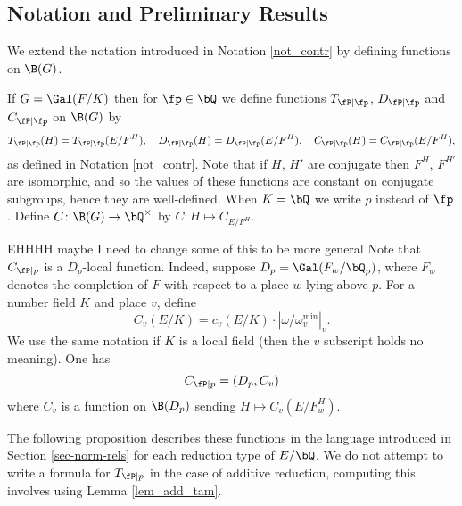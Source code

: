 \subsection{Notation and Preliminary Results}

We extend the notation introduced in Notation \ref{not_contr} by defining functions on $\B(G)$. 

\begin{defn}\label{not_contr_fns}
    If $G = \Gal(F / K)$ then for $\fp \in \bQ$ we define functions $T_{\fP \mid \fp}$, $D_{\fP \mid \fp}$ and $C_{\fP \mid \fp}$ on $\B(G)$ by 
    \[ T_{\fP \mid \fp}(H) = T_{\fP \mid \fp}(E / F^H), \quad D_{\fP \mid \fp}(H) = D_{\fP \mid \fp}(E / F^H), \quad C_{\fP \mid \fp}(H) = C_{\fP \mid \fp}(E / F^H), \]
    as defined in Notation \ref{not_contr}.
    Note that if $H$, $H'$ are conjugate then $F^H$, $F^{H'}$ are isomorphic, and so the values of these functions are constant on conjugate subgroups, hence they are well-defined. When $K = \bQ$ we write $p$ instead of $\fp$. Define $C \colon \B(G) \to \bQ^{\times}$ by $C \colon H \mapsto C_{E / F^H}$.  
\end{defn}
 
{\color{red} EHHHH maybe I need to change some of this to be more general}
Note that $C_{\fP \mid p}$ is a $D_p$-local function. Indeed, suppose $D_p = \Gal(F_w / \bQ_p)$, where $F_w$ denotes the completion of $F$ with respect to a place $w$ lying above $p$. For a number field $K$ and place $v$, define $$C_v(E / K) = c_v(E / K) \cdot \left| \omega / \omega_v^{\min} \right|_v.$$ We use the same notation if $K$ is a local field (then the $v$ subscript holds no meaning).
One has
\begin{equation*}
    C_{\fP \mid p} = (D_p, C_v)
\end{equation*}
where $C_v$ is a function on $\B(D_p)$ sending $H \mapsto C_v(E / F_w^H)$.

The following proposition describes these functions in the language introduced in Section \ref{sec-norm-rels} for each reduction type of $E / \bQ$. We do not attempt to write a formula for $T_{\fP \mid p}$ in the case of additive reduction, computing this involves using Lemma \ref{lem_add_tam}.

